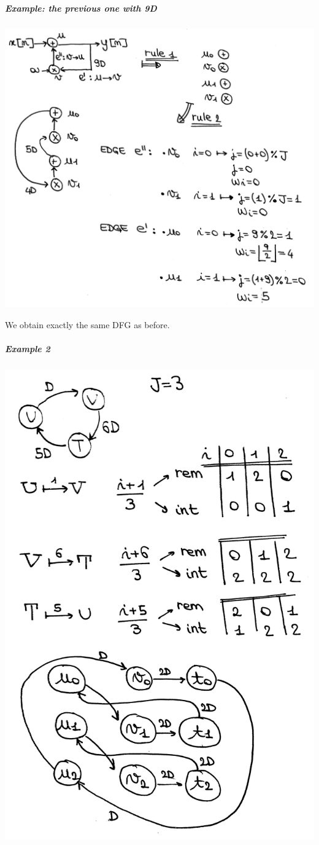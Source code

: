 \subparagraph{Example: the previous one with 9D}

\begin{center}
  \includegraphics[width=0.7\linewidth]{img/img1/25}
\end{center}

We obtain exactly the same DFG as before.

\subparagraph{Example 2}

\begin{center}
  \includegraphics[width=0.7\linewidth]{img/img1/26}
\end{center}

